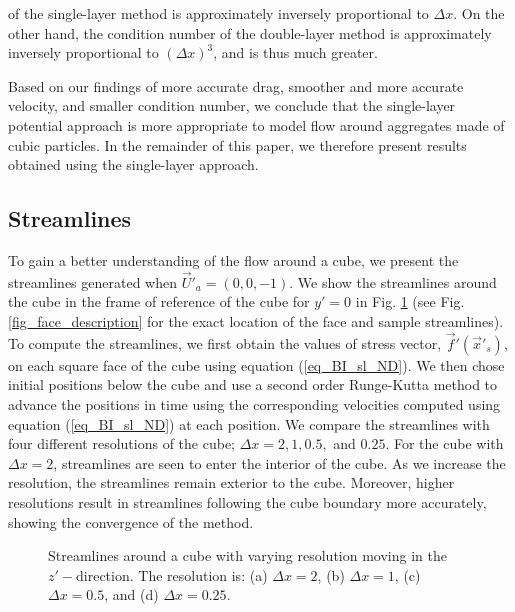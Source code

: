 of the single-layer method is approximately inversely proportional to $\Delta x$. 
On the other hand, the condition number of the double-layer method is approximately inversely proportional to $(\Delta x)^{3}$, and is thus much greater.
\par
Based on our findings of more accurate drag, smoother and more accurate velocity, and smaller condition number,  we conclude that the single-layer potential approach is more appropriate to model flow around aggregates made of cubic particles. 
In the remainder of this paper, we therefore present results obtained using the single-layer approach.
\subsection{Streamlines} 
\label{ch_streamlines}
To gain a better understanding of the flow around a cube, we present the streamlines generated when $\vec{U}'_a = (0,0,-1)$. We show the streamlines around the cube in the frame of reference of the cube for $y' = 0$ in Fig.  \ref{fig_strlns} 
(see Fig. \ref{fig_face_description} for the exact location of the face and sample streamlines).
To compute the streamlines, we first obtain the values of stress vector, $\vec{f}'(\vec{x}'_s)$, on each square face of the cube using equation (\ref{eq_BI_sl_ND}).
We then chose initial positions below the cube and use a second order Runge-Kutta method to advance the positions in time using the corresponding velocities computed using equation (\ref{eq_BI_sl_ND}) at each position. 
We compare the streamlines with four different resolutions of the cube; $\Delta x = 2,1, 0.5,$ and $0.25$. For the cube with $\Delta x = 2$, streamlines are seen to enter the interior of the cube. As we increase the resolution, the streamlines remain exterior to the cube.
Moreover, higher resolutions result in streamlines following the cube  boundary more accurately, showing the convergence of the method.
\begin{figure}[ht]
	\begin{center}
	\end{center}
	\caption{Streamlines around a cube with varying resolution moving in the $z'-$direction. The resolution is: (a) $\Delta x = 2$, (b) $\Delta x = 1$, (c) $\Delta x  =0.5$, and (d) $ \Delta x =0.25$. }
	\label{fig_strlns}
\end{figure}
